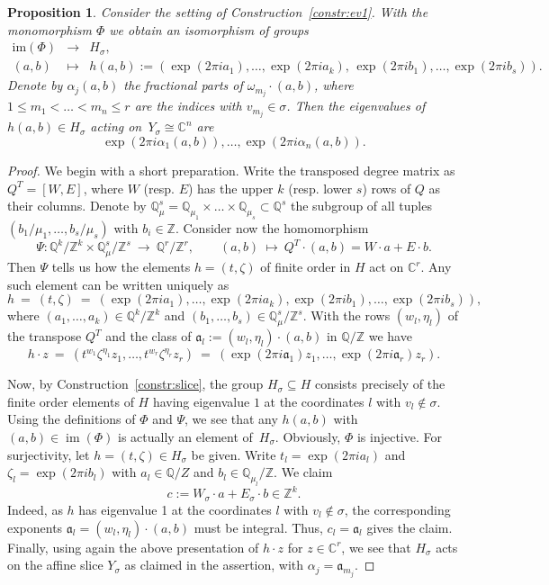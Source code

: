\documentclass[10pt,a4paper]{amsart}
\newtheorem{proposition}{Proposition}
\newcommand{\C}{\mathbb{C}}
\newcommand{\Q}{\mathbb{Q}}
\newcommand{\Z}{\mathbb{Z}}
\DeclareMathOperator{\im}{im}
\begin{document}
\begin{proposition}\label{prop:eigenvals}
Consider the setting of Construction~\ref{constr:ev1}.   
With the monomorphism $\Phi$ we obtain an isomorphism of groups
$$
\begin{array}{rcl}
\mathrm{im}(\Phi) & \to & H_\sigma,
\\[5pt]                                                     
(a,b) & \mapsto & h(a,b) := (\exp(2 \pi i a_1), \ldots, \exp(2 \pi i a_k), \, \exp(2 \pi i b_1), \ldots, \exp(2 \pi i b_s)).
\end{array}
$$
Denote by $\alpha_j(a,b)$ the fractional parts of $\omega_{m_j} \cdot (a,b)$,
where $1 \le m_1 < \ldots < m_n \le r$ are the indices with $v_{m_j} \in \sigma$.
Then the eigenvalues of $h(a,b) \in H_\sigma$ acting on~$Y_\sigma \cong \C^n$ are
$$
\exp(2 \pi i \alpha_1(a,b)), \ldots, \exp(2 \pi i \alpha_n(a,b)).
$$
\end{proposition}

\begin{proof}
We begin with a short preparation.
Write the transposed degree matrix as $Q^T= [W,E]$, where $W$
(resp. $E$) has the upper $k$ (resp. lower $s$) rows of $Q$ as
their columns. Denote by $\Q_\mu^s=\Q_{\mu_1}\times\dots\times\Q_{\mu_s}\subset\Q^s$ the subgroup of all tuples $(b_1/\mu_1,\dots,b_s/\mu_s)$ with $b_i\in\Z$. Consider now the homomorphism 
$$
\Psi \colon
\Q^k/\Z^k \times \Q_\mu^s/\Z^s \ \to \ \Q^r/\Z^r,
\qquad
(a,b) \ \mapsto \ Q^T \cdot (a, b) =  W \cdot a + E \cdot b.
$$  
Then $\Psi$ tells us how the elements $h = (t,\zeta)$ of
finite order in $H$ act on $\C^r$.
Any such element can be written uniquely as 
$$
h
\ = \
(t,\zeta)
\ = \
\left(
\exp(2 \pi i a_1), \ldots, \exp(2 \pi i a_k),
\exp(2 \pi i b_1), \ldots, \exp(2 \pi i b_s)
\right),
$$
where $(a_1,\ldots, a_k) \in \Q^k/\Z^k$ and $(b_1,\ldots, b_s) \in \Q_\mu^s/\Z^s$.
With the rows $(w_l,\eta_l)$ of the transpose $Q^T$ and the class of
$\mathfrak{a}_l := (w_l,\eta_l) \cdot (a,b)$ in $\Q/\Z$ we have
$$
h \cdot z
\ = \
(t^{w_1}\zeta^{\eta_1}z_1, \ldots, t^{w_r}\zeta^{\eta_r}z_r)
\ = \
\left(\exp(2 \pi i\mathfrak{a}_1)z_1, \ldots, \exp(2 \pi i \mathfrak{a}_r)z_r \right).
$$

Now, by Construction~\ref{constr:slice}, the group $H_\sigma \subseteq H$
consists precisely of the finite order elements of $H$ having eigenvalue
$1$ at the coordinates $l$ with $v_l \not \in \sigma$.
Using the definitions of $\Phi$ and $\Psi$, we see that any $h(a,b)$ with $(a,b)\in\im(\Phi)$
is actually an element of~$H_\sigma$.
Obviously, $\Phi$ is injective.
For surjectivity, let $h = (t,\zeta) \in H_\sigma$ be given.
Write $t_l=\exp(2\pi i a_l)$ and  $\zeta_l=\exp(2\pi i b_l)$
with $a_l \in \Q/Z$ and $b_l \in \Q_{\mu_l}/\Z$.
We claim
$$
c := W_\sigma \cdot a + E_\sigma \cdot b \in \Z^k.
$$
Indeed, as $h$ has eigenvalue 1 at the coordinates $l$
with $v_l \not \in \sigma$, the corresponding exponents
$\mathfrak{a}_l = (w_l,\eta_l) \cdot (a,b)$ must be integral.
Thus,  $c_l=\mathfrak{a}_l$ gives the claim.
Finally, using again the above presentation of $h \cdot z$ for
$z \in \C^r$, we see that $H_\sigma$ acts on the affine slice
$Y_\sigma$ as claimed in the assertion, with $\alpha_j=\mathfrak{a}_{m_j}$.
\end{proof}
\end{document}
